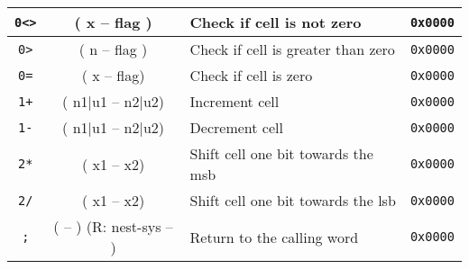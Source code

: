 \begin{center}
\begin{longtable}{|c|c|l|c|}
      \texttt{0<>}                            &
      ( x -- flag )                           &
      Check if cell is not zero               &
      \texttt{0x0000}                           \\ \hline
                              
      \texttt{0>}                             &
      ( n -- flag )                           &
      Check if cell is greater than zero      &
      \texttt{0x0000}                           \\ \hline
                              
      \texttt{0=}                             &
      ( x -- flag)                            &
      Check if cell is zero                   &
      \texttt{0x0000}                           \\ \hline
                              
      \texttt{1+}                             &
      ( n1$\mid$u1 -- n2$\mid$u2)             &
      Increment cell                          &
      \texttt{0x0000}                           \\ \hline

      \texttt{1-}                             &
      ( n1$\mid$u1 -- n2$\mid$u2)             &
      Decrement cell                          &
      \texttt{0x0000}                           \\ \hline

      \texttt{2*}                             &
      ( x1 -- x2)                             &
      Shift cell one bit towards the \gls{msb} &
      \texttt{0x0000}                           \\ \hline

      \texttt{2/}                             &
      ( x1 -- x2)                             &
      Shift cell one bit towards the \gls{lsb} &
      \texttt{0x0000}                           \\ \hline

      \texttt{;}                              &
      ( -- ) (R: nest-sys -- )                &
      Return to the calling word              &
      \texttt{0x0000}                           \\ \hline


\end{longtable}
\end{center}
